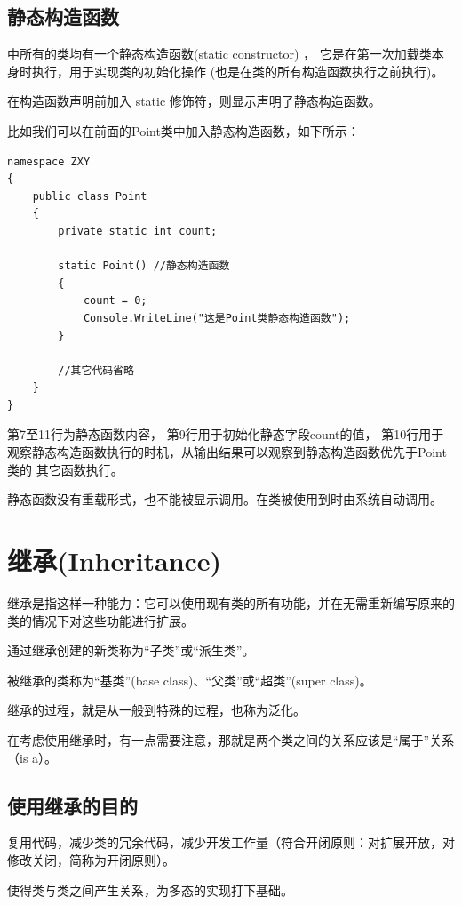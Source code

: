 \subsection{静态构造函数}
 \cs 中所有的类均有一个静态构造函数(static constructor) ，
 它是在第一次加载类本身时执行，用于实现类的初始化操作
 (也是在类的所有构造函数执行之前执行)。

 在构造函数声明前加入 static 修饰符，则显示声明了静态构造函数。

 比如我们可以在前面的Point类中加入静态构造函数，如下所示：

\begin{lstlisting}
namespace ZXY
{
    public class Point
    {
        private static int count;
            
        static Point() //静态构造函数
        {
            count = 0;
            Console.WriteLine("这是Point类静态构造函数");
        }

        //其它代码省略
    }
}
\end{lstlisting}

第7至11行为静态函数内容， 第9行用于初始化静态字段count的值，
第10行用于观察静态构造函数执行的时机，从输出结果可以观察到静态构造函数优先于Point类的
其它函数执行。

静态函数没有重载形式，也不能被显示调用。在类被使用到时由系统自动调用。


\section{继承(Inheritance)}

继承是指这样一种能力：它可以使用现有类的所有功能，并在无需重新编写原来的类的情况下对这些功能进行扩展。

通过继承创建的新类称为“子类”或“派生类”。

被继承的类称为“基类”(base class)、“父类”或“超类”(super class)。

继承的过程，就是从一般到特殊的过程，也称为泛化。

在考虑使用继承时，有一点需要注意，那就是两个类之间的关系应该是“属于”关系（is a）。

\subsection{使用继承的目的}

复用代码，减少类的冗余代码，减少开发工作量（符合开闭原则：对扩展开放，对修改关闭，简称为开闭原则）。

使得类与类之间产生关系，为多态的实现打下基础。


